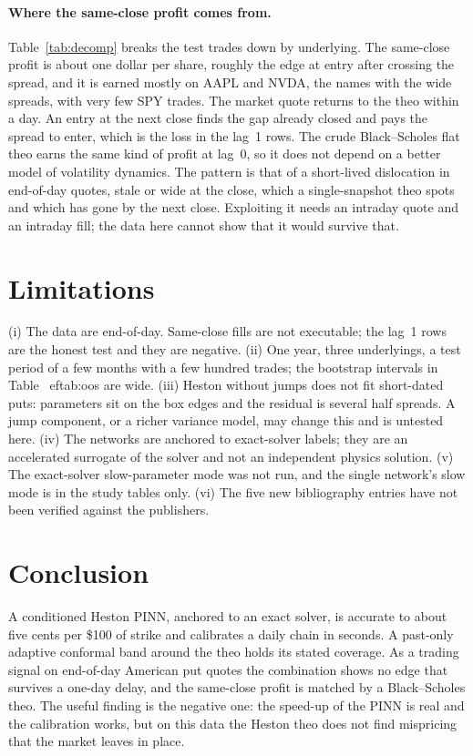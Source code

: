 \documentclass[11pt]{article}
\begin{document}

\paragraph{Where the same-close profit comes from.}
Table~\ref{tab:decomp} breaks the test trades down by underlying. The same-close profit is about one dollar per share, roughly the edge at entry after crossing the spread, and it is earned mostly on AAPL and NVDA, the names with the wide spreads, with very few SPY trades. The market quote returns to the theo within a day. An entry at the next close finds the gap already closed and pays the spread to enter, which is the loss in the lag~1 rows. The crude Black--Scholes flat theo earns the same kind of profit at lag~0, so it does not depend on a better model of volatility dynamics. The pattern is that of a short-lived dislocation in end-of-day quotes, stale or wide at the close, which a single-snapshot theo spots and which has gone by the next close. Exploiting it needs an intraday quote and an intraday fill; the data here cannot show that it would survive that.

\section{Limitations}
(i) The data are end-of-day. Same-close fills are not executable; the lag~1 rows are the honest test and they are negative. (ii) One year, three underlyings, a test period of a few months with a few hundred trades; the bootstrap intervals in Table~
ef{tab:oos} are wide. (iii) Heston without jumps does not fit short-dated puts: parameters sit on the box edges and the residual is several half spreads. A jump component, or a richer variance model, may change this and is untested here. (iv) The networks are anchored to exact-solver labels; they are an accelerated surrogate of the solver and not an independent physics solution. (v) The exact-solver slow-parameter mode was not run, and the single network's slow mode is in the study tables only. (vi) The five new bibliography entries have not been verified against the publishers.

\section{Conclusion}
A conditioned Heston PINN, anchored to an exact solver, is accurate to about five cents per \$100 of strike and calibrates a daily chain in seconds. A past-only adaptive conformal band around the theo holds its stated coverage. As a trading signal on end-of-day American put quotes the combination shows no edge that survives a one-day delay, and the same-close profit is matched by a Black--Scholes theo. The useful finding is the negative one: the speed-up of the PINN is real and the calibration works, but on this data the Heston theo does not find mispricing that the market leaves in place.
\end{document}
